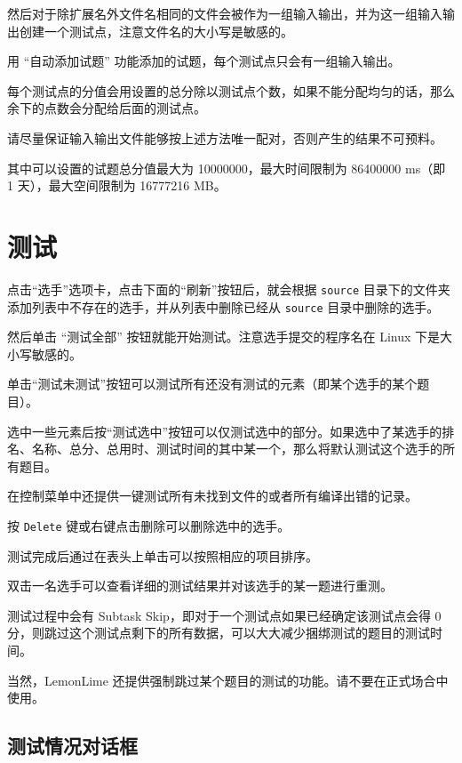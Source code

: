\documentclass[UTF-8]{ctexart}
\begin{document}
			然后对于除扩展名外文件名相同的文件会被作为一组输入输出，并为这一组输入输出创建一个测试点，注意文件名的大小写是敏感的。
			
			用 “自动添加试题” 功能添加的试题，每个测试点只会有一组输入输出。
			
			每个测试点的分值会用设置的总分除以测试点个数，如果不能分配均匀的话，那么余下的点数会分配给后面的测试点。
			
			请尽量保证输入输出文件能够按上述方法唯一配对，否则产生的结果不可预料。
			
			其中可以设置的试题总分值最大为 10000000，最大时间限制为 86400000 ms（即 1 天），最大空间限制为 16777216 MB。
			
	\newpage
		
	\section{测试}
			
		点击“选手”选项卡，点击下面的“刷新”按钮后，就会根据 \texttt{source} 目录下的文件夹添加列表中不存在的选手，并从列表中删除已经从 \texttt{source} 目录中删除的选手。
		
		然后单击 “测试全部” 按钮就能开始测试。注意选手提交的程序名在 Linux 下是大小写敏感的。
		
		单击“测试未测试”按钮可以测试所有还没有测试的元素（即某个选手的某个题目）。
		
		选中一些元素后按“测试选中”按钮可以仅测试选中的部分。如果选中了某选手的排名、名称、总分、总用时、测试时间的其中某一个，那么将默认测试这个选手的所有题目。
		
		在控制菜单中还提供一键测试所有未找到文件的或者所有编译出错的记录。
		
		按 \texttt{Delete} 键或右键点击删除可以删除选中的选手。
		
		测试完成后通过在表头上单击可以按照相应的项目排序。
		
		双击一名选手可以查看详细的测试结果并对该选手的某一题进行重测。
		
		测试过程中会有 Subtask Skip，即对于一个测试点如果已经确定该测试点会得 0 分，则跳过这个测试点剩下的所有数据，可以大大减少捆绑测试的题目的测试时间。
		
		当然，LemonLime 还提供强制跳过某个题目的测试的功能。请不要在正式场合中使用。
		
		\subsection{测试情况对话框}
		
\end{document}
